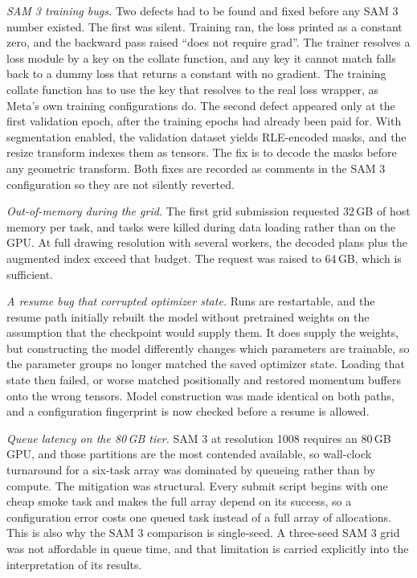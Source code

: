 \emph{SAM 3 training bugs.} Two defects had to be found and fixed before any SAM
3 number existed. The first was silent. Training ran, the loss printed as a
constant zero, and the backward pass raised ``does not require grad''. The
trainer resolves a loss module by a key on the collate function, and any key it
cannot match falls back to a dummy loss that returns a constant with no
gradient. The training collate function has to use the key that resolves to the
real loss wrapper, as Meta's own training configurations do. The second defect
appeared only at the first validation epoch, after the training epochs had
already been paid for. With segmentation enabled, the validation dataset yields
RLE-encoded masks, and the resize transform indexes them as tensors. The fix is
to decode the masks before any geometric transform. Both fixes are recorded as
comments in the SAM 3 configuration so they are not silently reverted.

\emph{Out-of-memory during the grid.} The first grid submission requested 32\,GB
of host memory per task, and tasks were killed during data loading rather than
on the GPU. At full drawing resolution with several workers, the decoded plans
plus the augmented index exceed that budget. The request was raised to 64\,GB,
which is sufficient.

\emph{A resume bug that corrupted optimizer state.} Runs are restartable, and
the resume path initially rebuilt the model without pretrained weights on the
assumption that the checkpoint would supply them. It does supply the weights,
but constructing the model differently changes which parameters are trainable,
so the parameter groups no longer matched the saved optimizer state. Loading
that state then failed, or worse matched positionally and restored momentum
buffers onto the wrong tensors. Model construction was made identical on both
paths, and a configuration fingerprint is now checked before a resume is
allowed.

\emph{Queue latency on the 80\,GB tier.} SAM 3 at resolution 1008 requires an
80\,GB GPU, and those partitions are the most contended available, so wall-clock
turnaround for a six-task array was dominated by queueing rather than by
compute. The mitigation was structural. Every submit script begins with one
cheap smoke task and makes the full array depend on its success, so a
configuration error costs one queued task instead of a full array of
allocations. This is also why the SAM 3 comparison is single-seed. A three-seed
SAM 3 grid was not affordable in queue time, and that limitation is carried
explicitly into the interpretation of its results.

